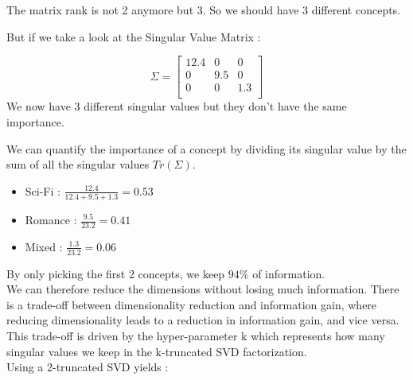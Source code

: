 \documentclass{article}
\begin{document}
The matrix rank is not 2 anymore but 3. So we should have 3 different concepts.

But if we take a look at the Singular Value Matrix :

\[
\Sigma = \begin{bmatrix} 12.4 & 0 & 0\\ 0 & 9.5 & 0 \\ 0 & 0 & 1.3 \\ \end{bmatrix}
\]
We now have 3 different singular values but they don't have the same importance.

We can quantify the importance of a concept by dividing its singular value by the sum of all the singular values $Tr(\Sigma)$.

\begin{itemize}
    \item Sci-Fi : $\frac{12.4}{12.4+9.5+1.3} = 0.53$
    \item Romance : $\frac{9.5}{23.2} = 0.41$
    \item Mixed : $\frac{1.3}{23.2} = 0.06$
\end{itemize}

By only picking the first 2 concepts, we keep $94 \%$ of information. \\
We can therefore reduce the dimensions without losing much information. There is a trade-off between dimensionality reduction and information gain, where reducing dimensionality leads to a reduction in information gain, and vice versa. This trade-off is driven by the hyper-parameter k which represents how many singular values we keep in the k-truncated SVD factorization. \\
Using a 2-truncated SVD yields :
\end{document}
